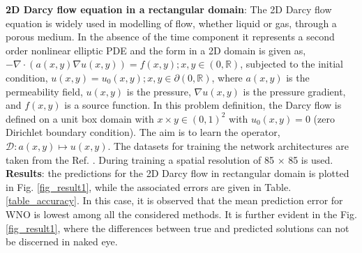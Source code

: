 \documentclass{article}
\begin{document}
\textbf{2D Darcy flow equation in a rectangular domain}: The 2D Darcy flow equation is widely used in modelling of flow, whether liquid or gas, through a  porous medium. In the absence of the time component it represents a second order nonlinear elliptic PDE and the form in a 2D domain is given as,
$-\nabla \cdot \left(a(x,y) \nabla u(x,y) \right) =f(x,y); x,y \in(0,\mathbb{R})$, subjected to the initial condition, $u(x,y) = u_0({x,y}); x,y \in \partial(0,\mathbb{R})$, where $a(x,y)$ is the permeability field, $u(x,y)$ is the pressure, $\nabla u(x,y)$ is the pressure gradient, and $f(x,y)$ is a source function. In this problem definition, the Darcy flow is defined on a unit box domain with $x \times y \in (0, 1)^2$ with $u_0(x,y) = 0$ (zero Dirichlet boundary condition). The aim is to learn the operator, $\mathcal{D}: a(x,y) \mapsto u(x,y)$. The datasets for training the network architectures are taken from the Ref. \cite{li2020fourier}. During training a spatial resolution of 85 $\times$ 85 is used. 
\textbf{Results}: the predictions for the 2D Darcy flow in rectangular domain is plotted in Fig. \ref{fig_result1}, while the associated errors are given in Table. \ref{table_accuracy}. In this case, it is observed that the mean prediction error for WNO is lowest among all the considered methods. It is further evident in the Fig. \ref{fig_result1}, where the differences between true and predicted solutions can not be discerned in naked eye.
\end{document}
